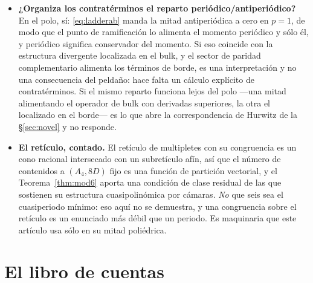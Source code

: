 \documentclass[11pt,a4paper]{article}
\newcommand{\ZZ}{\mathbb{Z}}
\begin{document}
\begin{itemize}
los $T^2/\ZZ_N$, y en siete dimensiones--- no lo zanja un solo modelo.
\item \textbf{¿Organiza los contratérminos el reparto periódico/antiperiódico?} En el polo, sí:
\eqref{eq:ladderab} manda la mitad antiperiódica a cero en $p=1$, de modo que el punto de
ramificación lo alimenta el momento periódico y sólo él, y periódico significa conservador del
momento. Si eso coincide con la estructura divergente localizada en el bulk, y el sector de paridad
complementario alimenta los términos de borde, es una interpretación y no una consecuencia del
peldaño: hace falta un cálculo explícito de contratérminos. Si el mismo reparto funciona lejos del polo ---una mitad alimentando el
operador de bulk con derivadas superiores, la otra el localizado en el borde--- es lo que abre la
correspondencia de Hurwitz de la \S\ref{sec:novel} y no responde.
\item \textbf{El retículo, contado.} El retículo de multipletes con su congruencia es un cono
racional intersecado con un subretículo afín, así que el número de contenidos a $(A_4,8D)$ fijo es
una función de partición vectorial, y el Teorema~\ref{thm:mod6} aporta una condición de clase
residual de las que sostienen su estructura cuasipolinómica por cámaras. \emph{No} que seis sea el
cuasiperiodo mínimo: eso aquí no se demuestra, y una congruencia sobre el retículo es un enunciado
más débil que un periodo. Es maquinaria que
este artículo usa sólo en su mitad poliédrica.
\end{itemize}

\section*{El libro de cuentas}
\end{document}
